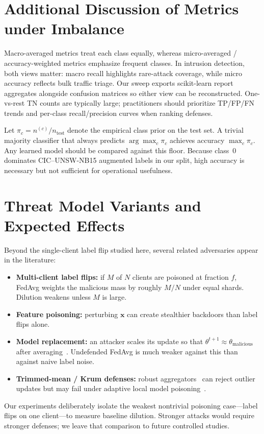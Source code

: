 \documentclass[journal]{IEEEtran}
\begin{document}
\section{Additional Discussion of Metrics under Imbalance}
\label{app:metrics}
Macro-averaged metrics treat each class equally, whereas micro-averaged / accuracy-weighted metrics emphasize frequent classes. In intrusion detection, both views matter: macro recall highlights rare-attack coverage, while micro accuracy reflects bulk traffic triage. Our sweep exports scikit-learn report aggregates alongside confusion matrices so either view can be reconstructed. One-vs-rest TN counts are typically large; practitioners should prioritize TP/FP/FN trends and per-class recall/precision curves when ranking defenses.

Let $\pi_c=n^{(c)}/n_{\mathrm{test}}$ denote the empirical class prior on the test set. A trivial majority classifier that always predicts $\arg\max_c \pi_c$ achieves accuracy $\max_c\pi_c$. Any learned model should be compared against this floor. Because class~0 dominates CIC--UNSW-NB15 augmented labels in our split, high accuracy is necessary but not sufficient for operational usefulness.

\section{Threat Model Variants and Expected Effects}
\label{app:threats}
Beyond the single-client label flip studied here, several related adversaries appear in the literature:
\begin{itemize}
\item \textbf{Multi-client label flips:} if $M$ of $N$ clients are poisoned at fraction $f$, FedAvg weights the malicious mass by roughly $M/N$ under equal shards. Dilution weakens unless $M$ is large.
\item \textbf{Feature poisoning:} perturbing $\mathbf{x}$ can create stealthier backdoors than label flips alone.
\item \textbf{Model replacement:} an attacker scales its update so that $\theta^{t+1}\approx\theta_{\mathrm{malicious}}$ after averaging~\cite{bagdasaryan2020backdoor}. Undefended FedAvg is much weaker against this than against naive label noise.
\item \textbf{Trimmed-mean / Krum defenses:} robust aggregators~\cite{blanchard2017machine,yin2018byzantine} can reject outlier updates but may fail under adaptive local model poisoning~\cite{fang2020local}.
\end{itemize}
Our experiments deliberately isolate the weakest nontrivial poisoning case---label flips on one client---to measure baseline dilution. Stronger attacks would require stronger defenses; we leave that comparison to future controlled studies.
\end{document}

